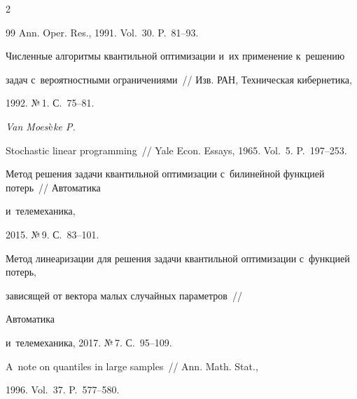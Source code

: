 \begin{multicols}{2}
{{\begin{thebibliography}{99}
Ann. Oper. Res., 1991. Vol.~30. P.~81--93.





Численные алгоритмы квантильной оптимизации и~их применение к~решению 

задач с~вероятностными ограничениями~// Изв. РАН, Техническая кибернетика, 

1992. №\,1. С.~75--81.




{\it Van Moes$\Grave{\mbox{e}}$ke P.}

Stochastic linear programming~// Yale Econ. Essays, 1965. Vol.~5. P.~197--253.





Метод решения задачи квантильной оптимизации с~билинейной функцией потерь~// Автоматика

и~телемеханика, 

2015. №\,9. С.~83--101.





Метод линеаризации для решения задачи квантильной оптимизации с~функцией потерь, 

зависящей от вектора малых случайных параметров~// 

Автоматика

и~телемеханика, 2017. №\,7. С.~95--109.





A~note on quantiles in large samples~// Ann. Math. Stat., 

1996. Vol.~37. P.~577--580.



 \end{thebibliography}



 }

 }



\end{multicols}



